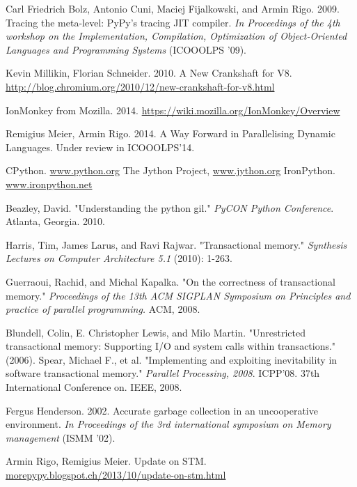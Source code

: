 \documentclass{sigplanconf}
\begin{document}
\begin{thebibliography}{}
\softraggedright

 Carl Friedrich Bolz, Antonio Cuni, Maciej
  Fijalkowski, and Armin Rigo. 2009. Tracing the meta-level: PyPy's
  tracing JIT compiler.  \emph{In Proceedings of the 4th workshop on the
    Implementation, Compilation, Optimization of Object-Oriented Languages
    and Programming Systems} (ICOOOLPS '09).

 Kevin Millikin, Florian Schneider. 2010.  A New
  Crankshaft for V8.
  \url{http://blog.chromium.org/2010/12/new-crankshaft-for-v8.html}

 IonMonkey from Mozilla. 2014.
  \url{https://wiki.mozilla.org/IonMonkey/Overview}

 Remigius Meier, Armin Rigo. 2014. A Way Forward
  in Parallelising Dynamic Languages. Under review in ICOOOLPS'14.

 CPython. \url{www.python.org}
 The Jython Project, \url{www.jython.org}
 IronPython. \url{www.ironpython.net}

 Beazley, David. "Understanding the python gil."
  \emph{PyCON Python Conference}. Atlanta, Georgia. 2010.

 Harris, Tim, James Larus, and Ravi
  Rajwar. "Transactional memory." \emph{Synthesis Lectures on Computer
  Architecture 5.1} (2010): 1-263.

 Guerraoui, Rachid, and Michal Kapalka. "On the
  correctness of transactional memory." \emph{Proceedings of the 13th
    ACM SIGPLAN Symposium on Principles and practice of parallel
    programming.} ACM, 2008.

 Blundell, Colin, E. Christopher Lewis, and Milo
  Martin. "Unrestricted transactional memory: Supporting I/O and system
  calls within transactions." (2006).
 Spear, Michael F., et al. "Implementing and
  exploiting inevitability in software transactional memory."
  \emph{Parallel Processing, 2008}. ICPP'08. 37th International
  Conference on. IEEE, 2008.

 Fergus Henderson. 2002. Accurate garbage collection
  in an uncooperative environment. \emph{In Proceedings of the 3rd
    international symposium on Memory management} (ISMM '02).

 Armin Rigo, Remigius Meier. Update on
  STM. \url{morepypy.blogspot.ch/2013/10/update-on-stm.html}


\end{thebibliography}
\end{document}
